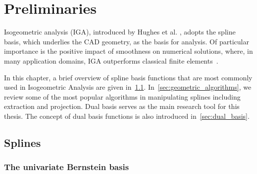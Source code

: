 \chapter{Preliminaries}
\label{chp:chapter2}
\graphicspath{{figures/}{figures/chapter2/}}

Isogeometric analysis (IGA), introduced by Hughes et al. \cite{HUGHES20054135}, adopts the spline basis, which underlies the CAD geometry, as the basis for analysis. Of particular importance is the positive impact of smoothness on numerical solutions, where, in many application domains, IGA outperforms classical finite elements~\cite{cottrell2009isogeometric,cottrell_studies_2007,cottrell2006isogeometric,hughes_duality_2008,bazilevs_isogeometric_2010,evans_n-widths_2009}.

In this chapter, a brief overview of spline basis functions that are most commonly used in Isogeometric Analysis are given in~\ref{sec:spline_overview}. In~\ref{sec:geometric_algorithms}, we review some of the most popular algorithms in manipulating splines including \Bezier extraction and \Bezier projection. Dual basis serves as the main research tool for this thesis. The concept of dual basis functions is also introduced in~\ref{sec:dual_basis}.

\section{Splines}\label{sec:spline_overview}

\subsection{The univariate Bernstein basis}

